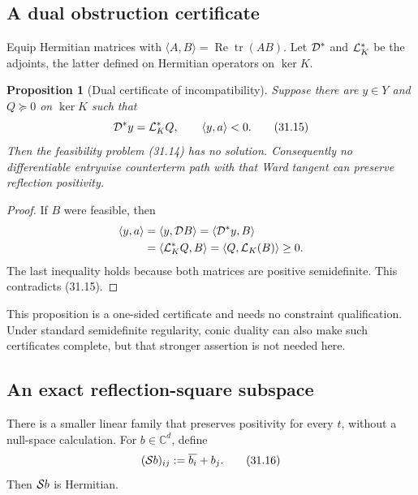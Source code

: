 \documentclass[11pt]{article}
\newtheorem{proposition}[theorem]{Proposition}
\theoremstyle{remark}
\begin{document}
\subsection{A dual obstruction certificate}

Equip Hermitian matrices with
\(\langle A,B\rangle=\operatorname{Re}\operatorname{tr}(AB)\).
Let \({\cal D}^*\) and \({\cal L}_K^*\) be the adjoints, the latter
defined on Hermitian operators on \(\ker K\).

\begin{proposition}[Dual certificate of incompatibility]
\label{prop:v12v31-dual}
Suppose there are \(y\in Y\) and \(Q\succeq0\) on \(\ker K\) such
that
\begin{equation}
 {\cal D}^*y={\cal L}_K^*Q,
 \qquad
 \langle y,a\rangle<0.                           \tag{31.15}
\end{equation}
Then the feasibility problem (31.14) has no solution.  Consequently
no differentiable entrywise counterterm path with that Ward tangent
can preserve reflection positivity.
\end{proposition}

\begin{proof}
If \(B\) were feasible, then
\begin{align*}
 \langle y,a\rangle
 &=
 \langle y,{\cal D}B\rangle
 =
 \langle{\cal D}^*y,B\rangle\\
 &=
 \langle{\cal L}_K^*Q,B\rangle
 =
 \langle Q,{\cal L}_K(B)\rangle
 \geq0.
\end{align*}
The last inequality holds because both matrices are positive
semidefinite.  This contradicts (31.15).
\end{proof}

This proposition is a one-sided certificate and needs no
constraint qualification.  Under standard semidefinite
regularity, conic duality can also make such certificates complete,
but that stronger assertion is not needed here.

\subsection{An exact reflection-square subspace}

There is a smaller linear family that preserves positivity for every
\(t\), without a null-space calculation.  For \(b\in\mathbb C^d\),
define
\begin{equation}
 ({\cal S}b)_{ij}:=\overline{b_i}+b_j.            \tag{31.16}
\end{equation}
Then \({\cal S}b\) is Hermitian.
\end{document}
